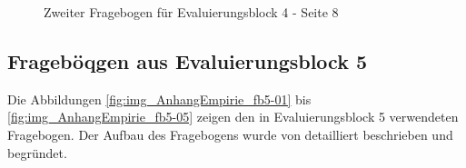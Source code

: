 \begin{figure}[htbp]
	\centering
	\caption{Zweiter Fragebogen für Evaluierungsblock 4 - Seite 8}
	\label{fig:img_AnhangEmpirie_fb4_2-08}
\end{figure}


\subsection{Frageböqgen aus Evaluierungsblock 5}
\label{sub:fb_eval5}

Die Abbildungen \ref{fig:img_AnhangEmpirie_fb5-01} bis \ref{fig:img_AnhangEmpirie_fb5-05} zeigen den in Evaluierungsblock 5 verwendeten Fragebogen. Der Aufbau des Fragebogens wurde von \citet{Bindreiter10} detailliert beschrieben und begründet.

